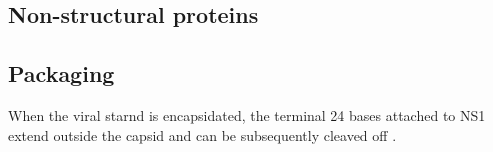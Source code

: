\subsection{Non-structural proteins}
 
 \subsection{Packaging}
When the viral starnd is encapsidated, the terminal 24 bases attached to NS1 extend outside the capsid and can be subsequently cleaved off \cite{pmid2527311}.

\section{}


\subsection{}



\subsection{}

